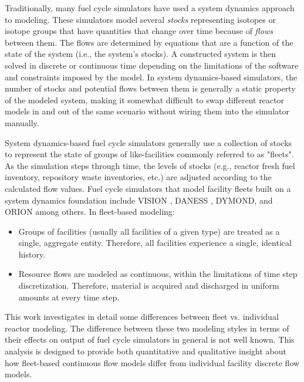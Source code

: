 \documentclass{style}
\begin{document}
Traditionally, many fuel cycle simulators have used a system dynamics approach
\cite{forrester_industrial_1961} to modeling. These simulators model several
\emph{stocks} representing isotopes or isotope groups that have quantities that change
over time because of \emph{flows} between them.  The flows are determined by equations
that are a function of the state of the system (i.e., the system's stocks).  A
constructed system is then solved in discrete or continuous time depending on
the limitations of the software and constraints imposed by the model.  In
system dynamics-based simulators, the number of stocks and potential flows between
them is generally a static property of the modeled system, making it somewhat
difficult to swap different reactor models in and out of the same scenario
without wiring them into the simulator manually.

System dynamics-based fuel cycle simulators generally use a collection of
stocks to represent the state of groups of like-facilities commonly referred
to as "fleets".  As the simulation steps through time, the levels of stocks
(e.g., reactor fresh fuel inventory, repository waste inventories, etc.) are
adjusted according to the calculated flow values.  Fuel cycle simulators that model
facility fleets built on a system dynamics foundation include VISION
\cite{jacobson_verifiable_2010}, DANESS \cite{van_den_durpel_daness_2009},
DYMOND, and ORION \cite{gregg_orion_2012} among
others.  In fleet-based modeling:

\begin{itemize}

    \item Groups of facilities (usually all facilities of a given type) are
        treated as a single, aggregate entity. Therefore, all facilities experience
        a single, identical history.

    \item Resource flows are modeled as continuous, within the limitations of time
        step discretization.  Therefore, material is acquired and discharged in
        uniform amounts at every time step.

\end{itemize}

This work investigates in detail some differences between fleet vs. individual
reactor modeling.  The difference between these two modeling styles in terms
of their effects on output of fuel cycle simulators in general is not well
known. This analysis is designed to provide both quantitative and
qualitative insight about how fleet-based continuous flow models differ from
individual facility discrete flow models.
\end{document}
